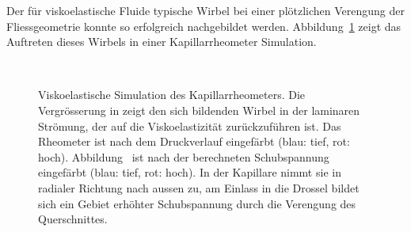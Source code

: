 Der für viskoelastische Fluide typische Wirbel bei einer plötzlichen Verengung der Fliessgeometrie \cite{Evans198611} konnte so erfolgreich nachgebildet werden. Abbildung~\ref{kapRheoVisco} zeigt das Auftreten dieses Wirbels in einer Kapillarrheometer Simulation.
%
\begin{figure}
    \centering
    \\
    \caption{Viskoelastische Simulation des Kapillarrheometers. Die Vergrösserung in  zeigt den sich bildenden Wirbel in der laminaren Strömung, der auf die Visko\-elastizität zurückzuführen ist. Das Rheometer ist nach dem Druckverlauf eingefärbt (blau: tief, rot: hoch). Abbildung~ ist nach der berechneten Schubspannung eingefärbt (blau: tief, rot: hoch). In der Kapillare nimmt sie in radialer Richtung nach aussen zu, am Einlass in die Drossel bildet sich ein Gebiet erhöhter Schubspannung durch die Verengung des Querschnittes.}
    \label{kapRheoVisco}
\end{figure}
%


